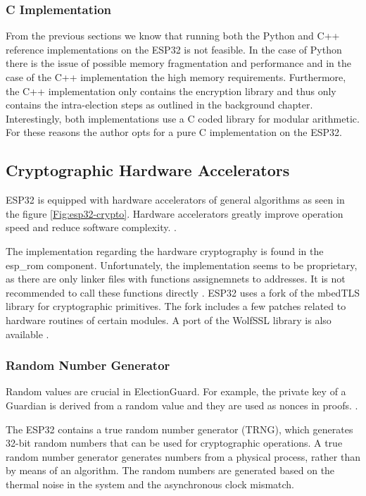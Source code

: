 \subsubsection{C Implementation}
From the previous sections we know that running both the Python and C++ reference implementations on the ESP32 is not feasible. In the case of Python there is the issue of possible memory fragmentation and performance and in the case of the C++ implementation the high memory requirements. Furthermore, the C++ implementation only contains the encryption library and thus only contains the intra-election steps as outlined in the background chapter. Interestingly, both implementations use a C coded library for modular arithmetic. For these reasons the author opts for a pure C implementation on the ESP32. 

\subsection{Cryptographic Hardware Accelerators}
ESP32 is equipped with hardware accelerators of general algorithms as seen in the figure \ref{Fig:esp32-crypto}. Hardware accelerators greatly improve operation speed and reduce software complexity. \cite[32]{esp32-series}.

The implementation regarding the hardware cryptography is found in the esp_rom component. Unfortunately, the implementation seems to be proprietary, as there are only linker files with functions assignemnets to addresses. It is not recommended to call these functions directly \cite{esp-rom}. ESP32 uses a fork of the mbedTLS library for cryptographic primitives. The fork includes a few patches related to hardware routines of certain modules. A port of the WolfSSL library is also available \cite{esp32-ref}.

\subsubsection{Random Number Generator}

Random values are crucial in ElectionGuard. For example, the private key of a Guardian is derived from a random value and they are used as nonces in proofs. \cite[9, 13]{eg-spec}.

The ESP32 contains a true random number generator (TRNG), which generates 32-bit random numbers that can be used for cryptographic operations. A true random number generator generates numbers from a physical process, rather than by means of an algorithm. The random numbers are generated based on the thermal noise in the system and the asynchronous clock mismatch. \cite[604]{esp32-ref}

